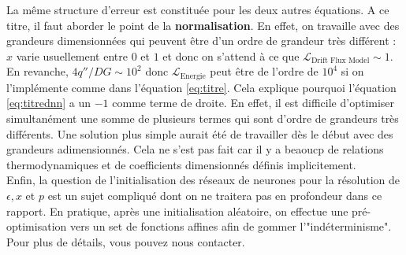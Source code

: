 La même structure d'erreur est constituée pour les deux autres équations. A ce titre, il faut aborder le point de la \textbf{normalisation}. En effet, on travaille avec des grandeurs dimensionnées qui peuvent être d'un ordre de grandeur très différent : $x$ varie usuellement entre $0$ et $1$ et donc on s'attend à ce que $\mathcal{L}_{\text{Drift Flux Model}}\sim 1$. En revanche, $4q''/DG \sim 10^2$ donc $\mathcal{L}_{\text{Energie}}$ peut être de l'ordre de $10^4$ si on l'implémente comme dans l'équation \ref{eq:titre}. Cela explique pourquoi l'équation \ref{eq:titrednn} a un $-1$ comme terme de droite. En effet, il est difficile d'optimiser simultanément une somme de plusieurs termes qui sont d'ordre de grandeurs très différents. Une solution plus simple aurait été de travailler dès le début avec des grandeurs adimensionnés. Cela ne s'est pas fait car il y a beaoucp de relations thermodynamiques et de coefficients dimensionnés définis implicitement.\\

Enfin, la question de l'initialisation des réseaux de neurones pour la résolution de $\epsilon, x$ et $p$ est un sujet compliqué dont on ne traitera pas en profondeur dans ce rapport. En pratique, après une initialisation aléatoire, on effectue une pré-optimisation vers un set de fonctions affines afin de gommer l'"indéterminisme". Pour plus de détails, vous pouvez nous contacter.


